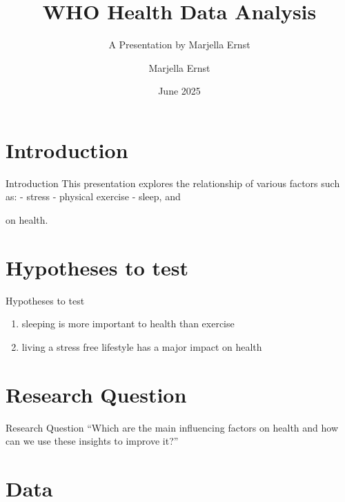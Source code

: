 \documentclass[
  11pt,
  ignorenonframetext,
]{beamer}
\title{WHO Health Data Analysis}
\subtitle{A Presentation by Marjella Ernst}
\author{Marjella Ernst}
\date{June 2025}
\providecommand{\tightlist}{%
  \setlength{\itemsep}{0pt}\setlength{\parskip}{0pt}}
\begin{document}
\frame{\titlepage}

\begin{frame}
\end{frame}

\section{\texorpdfstring{Introduction
\label{Introduction}}{Introduction }}\label{introduction}

\begin{frame}{Introduction \label{Introduction}}
This presentation explores the relationship of various factors such as:
- stress - physical exercise - sleep, and

on health.
\end{frame}

\section{Hypotheses to test}\label{hypotheses-to-test}

\begin{frame}{Hypotheses to test}
\begin{enumerate}
\tightlist
\item
  sleeping is more important to health than exercise
\item
  living a stress free lifestyle has a major impact on health
\end{enumerate}
\end{frame}

\section{Research Question}\label{research-question}

\begin{frame}{Research Question}
``Which are the main influencing factors on health and how can we use
these insights to improve it?''
\end{frame}

\section{Data}\label{data}
\end{document}
